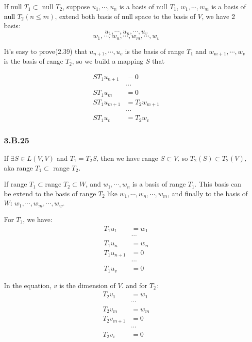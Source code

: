 If null $T_{1} \subset$ null $T_{2}$, suppose $u_{1},\cdots,u_{n}$ is a basis of null $T_{1}$,  $w_{1}, \cdots,w_{m}$ is a basis of null $T_{2} (n\leq m)$, extend both basis of null space to the basis of $V$, we have 2 basis:
\[u_{1},\cdots,u_{n},\cdots, u_{v}\]
\[w_{1},\cdots,w_{n},\cdots,w_{m}, \cdots, w_{v}\]

It's easy to prove(2.39) that $u_{n+1},\cdots,u_{v}$ is the basis of range $T_{1}$ and $w_{m+1},\cdots,w_{v}$ is the basis of range $T_{2}$, so we build a mapping $S$ that

\begin{equation*}
    \begin{split}
    ST_{1}u_{n+1} &= 0 \\
    &\cdots \\
    ST_{1}u_{m} &= 0 \\
    ST_{1}u_{m+1} &= T_{2}w_{m+1} \\
    &\cdots \\
    ST_{1}u_{v} &= T_{2}w_{v}
\end{split}
\end{equation*}

\subsubsection*{3.B.25}

If $\exists S\in L(V, V)$ and $T_{1} = T_{2}S$, then we have range $S \subset V$, so $T_{2}(S) \subset T_{2}(V)$, aka range $T_{1} \subset$ range $T_{2}$.

If range $T_{1}\subset $range $T_{2} \subset W$, and $w_{1}, \cdots, w_{n}$ is a basis of range $T_{1}$. 
This basis can be extend to the basis of range $T_{2}$ like $w_{1}, \cdots, w_{n}, \cdots, w_{m}$, and finally to the basis of $W$: $w_{1},\cdots,w_{m},\cdots, w_{w}$.

For $T_{1}$, we have:
\begin{equation*}
    \begin{split}
T_{1}u_{1} &= w_{1} \\
&\cdots \\
T_{1}u_{n} &= w_{n} \\
T_{1}u_{n+1} &= 0 \\
&\cdots \\
T_{1}u_{v} &= 0 
\end{split}
\end{equation*}

In the equation, $v$ is the dimension of $V$. and for $T_{2}$:
\begin{equation*}
    \begin{split}
T_{2}v_{1} &= w_{1} \\
&\cdots \\
T_{2}v_{m} &= w_{m} \\
T_{2}v_{m+1} &= 0 \\
&\cdots \\
T_{2}v_{v} &= 0 \\
\end{split}
\end{equation*}


